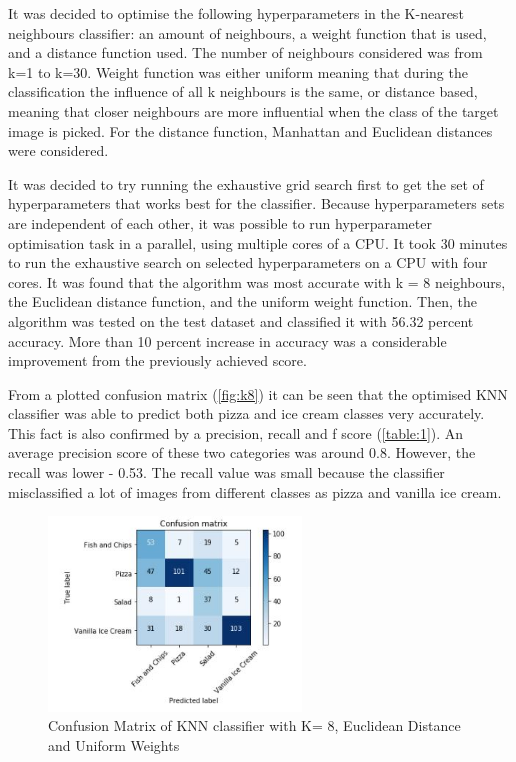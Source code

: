  It was decided to optimise the following hyperparameters in the  K-nearest neighbours classifier: an amount of neighbours, a weight function that is used, and a distance function used. The number of neighbours considered was from k=1 to k=30. Weight function was either uniform meaning that during the classification the influence of all k neighbours is the same, or distance based, meaning that closer neighbours are more influential when the class of the target image is picked.  For the distance function, Manhattan and Euclidean distances were considered.


It was decided to try running the exhaustive grid search first to get the set of hyperparameters that works best for the classifier. Because hyperparameters sets are independent of each other, it was possible to run hyperparameter optimisation task in a parallel, using multiple cores of a CPU. It took 30 minutes to run the exhaustive search on selected hyperparameters on a CPU with four cores. It was found that the algorithm was most accurate with k = 8 neighbours, the Euclidean distance function, and the uniform weight function. Then, the algorithm was tested on the test dataset and classified it with 56.32 percent accuracy. More than 10 percent increase in accuracy was a considerable improvement from the previously achieved score.

From a plotted confusion matrix (\autoref{fig:k8}) it can be seen that the optimised KNN classifier was able to predict both pizza and ice cream classes very accurately. This fact is also confirmed by a precision, recall and f score  (\autoref{table:1}). An average precision score of these two categories was around 0.8. However, the recall was lower - 0.53. The recall value was small because the classifier misclassified a lot of images from different classes as pizza and vanilla ice cream.



\begin{figure}[h]
\centering
\includegraphics[width=0.6\textwidth]{Figures/knn.JPG}
\caption{Confusion Matrix of KNN classifier with K= 8, Euclidean Distance and Uniform Weights}
\label{fig:k8}
\end{figure}

